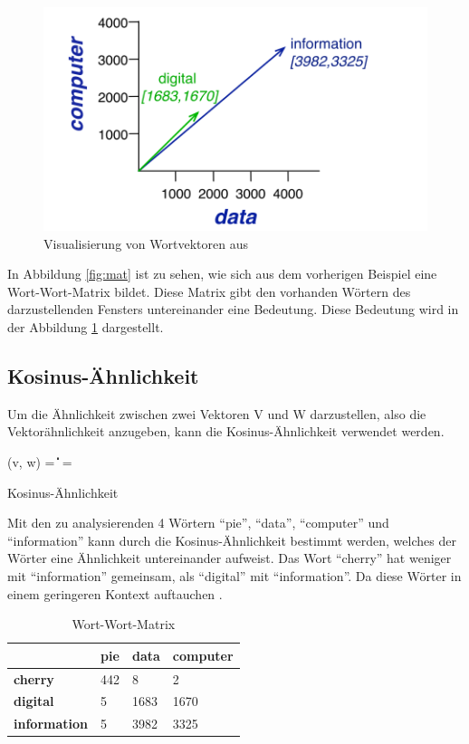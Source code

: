 \documentclass[
        ngerman,
        paper=a4,
        numbers=noendperiod,
]{scrreprt}
\begin{document}
\begin{figure}[H]
    \centering\includegraphics[width=0.5\linewidth]{images/vec.png}
    \caption[Visualisierung von Wortvektoren]{Visualisierung von Wortvektoren aus \citep[S. 105]{Jurafsky2014SpeechProcessing}}
    \label{fig:vec}
\end{figure}



In Abbildung \ref{fig:mat} ist zu sehen, wie sich aus dem vorherigen Beispiel eine Wort-Wort-Matrix bildet. Diese Matrix gibt den vorhanden Wörtern des darzustellenden Fensters untereinander eine Bedeutung. Diese Bedeutung wird in der Abbildung \ref{fig:vec} dargestellt.

\subsection{Kosinus-Ähnlichkeit}
Um die Ähnlichkeit zwischen zwei Vektoren V und W darzustellen, also die Vektorähnlichkeit anzugeben, kann die Kosinus-Ähnlichkeit verwendet werden.

\begin{xequation-} 
\centering \cos(v, w) = { \cdot {} \over \|\| \|\|} = 
\caption[Kosinus-Ähnlichkeit]{Kosinus-Ähnlichkeit} 
    \label{eqn:KSA}
\end{xequation-} 

Mit den zu analysierenden 4 Wörtern \enquote{pie}, \enquote{data}, \enquote{computer} und \enquote{information} kann durch die Kosinus-Ähnlichkeit bestimmt werden, welches der Wörter eine Ähnlichkeit untereinander aufweist. Das Wort \enquote{cherry} hat weniger mit \enquote{information} gemeinsam, als \enquote{digital} mit \enquote{information}. Da diese Wörter in einem geringeren Kontext auftauchen \citep[S. 105]{Jurafsky2014SpeechProcessing}.

\begin{table}[H]
{\small
    \begin{tabularx}{\textwidth}{X X X X} 
\hline     
                  &\textbf{pie}  & \textbf{data} & \textbf{computer}  \\ 
\hline    
    \textbf{cherry}      & 442        & 8 & 2         \\ 
    \textbf{digital}   & 5        & 1683 & 1670          \\ 
    \textbf{information} & 5        & 3982 & 3325           \\ 
    \end{tabularx}
\caption{Wort-Wort-Matrix}
    \label{tab:cos}
}
\end{table}
\end{document}
